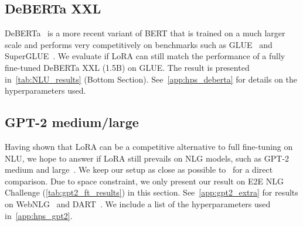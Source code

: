 \documentclass{article} %
\begin{document}
\subsection{DeBERTa XXL}
\label{sec:deberta_expt}
DeBERTa~\citep{he2021deberta} is a more recent variant of BERT that is trained on a much larger scale and performs very competitively on benchmarks such as GLUE~\citep{wang2019glue} and SuperGLUE~\citep{wang2020superglue}.
We evaluate if LoRA can still match the performance of a fully fine-tuned DeBERTa XXL (1.5B) on GLUE.
The result is presented in~\autoref{tab:NLU_results} (Bottom Section).
See~\autoref{app:hps_deberta} for details on the hyperparameters used.

\subsection{GPT-2 medium/large}
\label{sec:gpt2_expt}
Having shown that LoRA can be a competitive alternative to full fine-tuning on NLU, we hope to answer if LoRA still prevails on NLG models, such as GPT-2 medium and large~\citep{radford_language_nodate}.
We keep our setup as close as possible to~\cite{li_prefix-tuning_2021} for a direct comparison.
Due to space constraint, we only present our result on E2E NLG Challenge (\autoref{tab:gpt2_ft_results}) in this section.
See~\autoref{app:gpt2_extra} for results on WebNLG~\citep{gardent2017webnlg} and DART~\citep{nan2020dart}.
We include a list of the hyperparameters used in~\autoref{app:hps_gpt2}.
\end{document}
